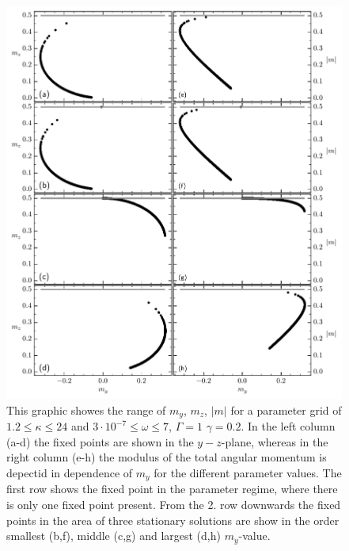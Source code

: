    \begin{figure}[H]
        \hspace*{-0.4cm}
        \includegraphics{pictures/fixp_boundaries.pdf}
        \caption{This graphic showes the range of $m_y$, $m_z$, $|m|$ for a parameter grid of $1.2\leq\kappa\leq24$ and $3\cdot10^{-7}\leq\omega\leq7$, $\Gamma=1$ $\gamma=0.2$. In the left column (a-d) the fixed points are shown in the $y-z$-plane, whereas in the right column (e-h) the modulus of the total angular momentum is depectid in dependence of $m_y$ for the different parameter values. The first row shows the fixed point in the parameter regime, where there is only one fixed point present. From the 2. row downwards the fixed points in the area of three stationary solutions are show in the order smallest (b,f), middle (c,g) and largest (d,h) $m_y$-value.}
    \end{figure}
    
    
    
